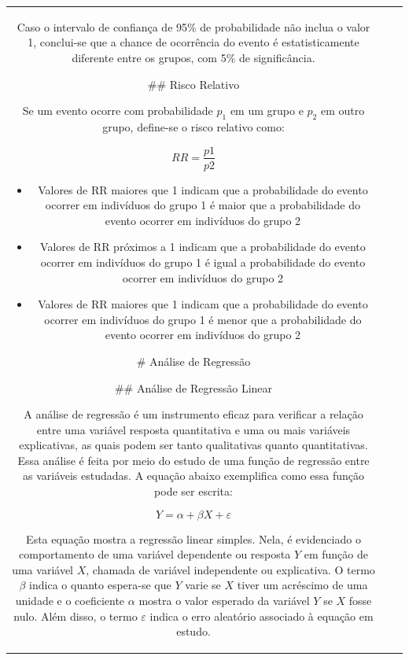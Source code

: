 \documentclass[
]{estat/estat}
\begin{document}
\begin{tabular}{c|cc}
\begin{itemize}
\end{itemize}

\par Caso o intervalo de confiança de 95\% de probabilidade não inclua o valor 1, conclui-se que a chance de ocorrência do evento é estatisticamente diferente entre os grupos, com 5\% de significância.

## Risco Relativo

\par Se um evento ocorre com probabilidade $p_1$ em um grupo e $p_2$ em outro grupo, define-se o risco relativo como:

$$RR=\frac{p1}{p2}$$

\begin{itemize}
    \item Valores de RR maiores que 1 indicam que a probabilidade do evento ocorrer em indivíduos do grupo 1 é maior que a probabilidade do evento ocorrer em indivíduos do grupo 2
    
    \item Valores de RR próximos a 1 indicam que a probabilidade do evento ocorrer em indivíduos do grupo 1 é igual a probabilidade do evento ocorrer em indivíduos do grupo 2
    
    \item Valores de RR maiores que 1 indicam que a probabilidade do evento ocorrer em indivíduos do grupo 1 é menor que a probabilidade do evento ocorrer em indivíduos do grupo 2
\end{itemize}

# Análise de Regressão

## Análise de Regressão Linear

A análise de regressão é um instrumento eficaz para verificar a relação entre uma variável resposta quantitativa e uma ou mais variáveis explicativas, as quais podem ser tanto qualitativas quanto quantitativas. Essa análise é feita por meio do estudo de uma função de regressão entre as variáveis estudadas. A equação abaixo exemplifica como essa função pode ser escrita:

$$
Y=\alpha + \beta X + \varepsilon
$$

Esta equação mostra a regressão linear simples. Nela, é evidenciado o comportamento de uma variável dependente ou resposta $Y$ em função de uma variável $X$, chamada de variável independente ou explicativa. O termo $\beta$ indica o quanto espera-se que $Y$ varie se $X$ tiver um acréscimo de uma unidade e o coeficiente $\alpha$ mostra o valor esperado da variável $Y$ se $X$ fosse nulo. Além disso, o termo $\varepsilon$ indica o erro aleatório associado à equação em estudo.


\end{tabular}
\end{document}
